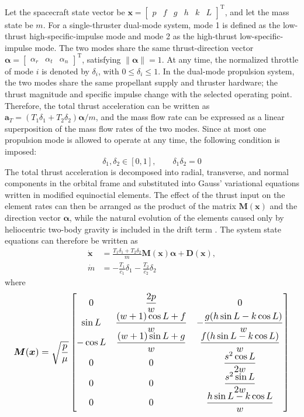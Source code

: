 ﻿\documentclass{IEEEtaes}
\begin{document}
Let the spacecraft state vector be $\bm{x}=\begin{bmatrix}p&f&g&h&k&L\end{bmatrix}^{\mathrm{T}}$, and let the mass state be $m$. For a single-thruster dual-mode system, mode 1 is defined as the low-thrust high-specific-impulse mode and mode 2 as the high-thrust low-specific-impulse mode. The two modes share the same thrust-direction vector $\bm{\alpha}=\begin{bmatrix}\alpha_r&\alpha_t&\alpha_n\end{bmatrix}^{\mathrm{T}}$, satisfying $\|\bm{\alpha}\|=1$. At any time, the normalized throttle of mode $i$ is denoted by $\delta_i$, with $0\leq\delta_i\leq1$. In the dual-mode propulsion system, the two modes share the same propellant supply and thruster hardware; the thrust magnitude and specific impulse change with the selected operating point. Therefore, the total thrust acceleration can be written as $\bm{a}_T=(T_1\delta_1+T_2\delta_2)\bm{\alpha}/m$, and the mass flow rate can be expressed as a linear superposition of the mass flow rates of the two modes. Since at most one propulsion mode is allowed to operate at any time, the following condition is imposed:
\begin{equation}
\delta_1,\delta_2\in[0,1],\qquad \delta_1\delta_2=0
\end{equation}
The total thrust acceleration is decomposed into radial, transverse, and normal components in the orbital frame and substituted into Gauss' variational equations written in modified equinoctial elements. The effect of the thrust input on the element rates can then be arranged as the product of the matrix $\bm{M}(\bm{x})$ and the direction vector $\bm{\alpha}$, while the natural evolution of the elements caused only by heliocentric two-body gravity is included in the drift term \cite{jiang2012,chi2022}. The system state equations can therefore be written as
\begin{equation}
\begin{aligned}
\dot{\bm{x}}&=\frac{T_1\delta_1+T_2\delta_2}{m}\bm{M}(\bm{x})\bm{\alpha}+\bm{D}(\bm{x}),\\
\dot{m}&=-\frac{T_1}{c_1}\delta_1-\frac{T_2}{c_2}\delta_2
\end{aligned}
\end{equation}
where
\begin{equation}
\resizebox{0.98\columnwidth}{!}{$\displaystyle
\bm{M}(\bm{x})=\sqrt{\frac{p}{\mu}}
\begin{bmatrix}
0 & \dfrac{2p}{w} & 0\\
\sin L & \dfrac{(w+1)\cos L+f}{w} & -\dfrac{g(h\sin L-k\cos L)}{w}\\
-\cos L & \dfrac{(w+1)\sin L+g}{w} & \dfrac{f(h\sin L-k\cos L)}{w}\\
0 & 0 & \dfrac{s^2\cos L}{2w}\\
0 & 0 & \dfrac{s^2\sin L}{2w}\\
0 & 0 & \dfrac{h\sin L-k\cos L}{w}
\end{bmatrix}
$}
\end{equation}
\end{document}
